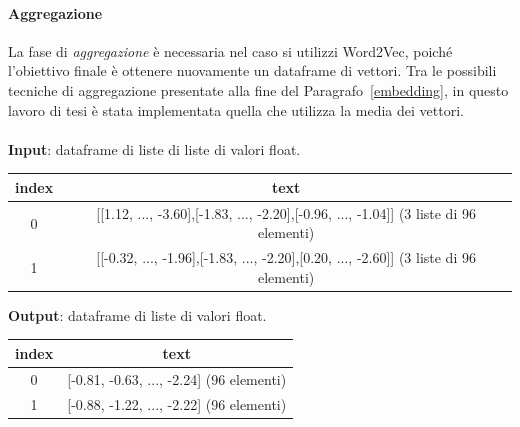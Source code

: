 \documentclass[12pt]{report}
\theoremstyle{definition}
\begin{document}
\paragraph{Aggregazione}
La fase di \textit{aggregazione} è necessaria nel caso si utilizzi Word2Vec, poiché l'obiettivo finale è ottenere nuovamente un dataframe di vettori. Tra le possibili tecniche di aggregazione presentate alla fine del Paragrafo~\ref{embedding}, in questo lavoro di tesi è stata implementata quella che utilizza la media dei vettori.
\\
\\
\textbf{Input}: dataframe di liste di liste di valori float.
\begin{center}
    \begin{tabular}{|c|c|}
    \hline
    \textbf{index} & \textbf{text} \\
    \hline
         0 & [[1.12, ..., -3.60],[-1.83, ..., -2.20],[-0.96, ..., -1.04]] (3 liste di 96 elementi) \\
         1 & [[-0.32, ..., -1.96],[-1.83, ..., -2.20],[0.20, ..., -2.60]] (3 liste di 96 elementi) \\
    \hline
    \end{tabular}
\end{center}
\textbf{Output}: dataframe di liste di valori float.
\begin{center}
    \begin{tabular}{|c|c|}
    \hline
    \textbf{index} & \textbf{text} \\
    \hline
         0 & [-0.81, -0.63, ..., -2.24] (96 elementi) \\
         1 & [-0.88, -1.22, ..., -2.22] (96 elementi) \\
    \hline
    \end{tabular}
\end{center}
\end{document}
